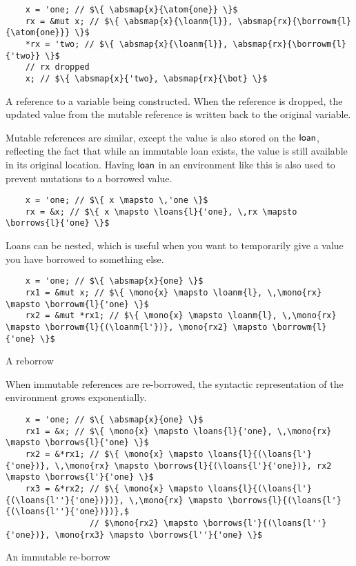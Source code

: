 \documentclass[12pt,twoside]{report}
\begin{document}
\begin{listing}[H]
  \begin{verbatim}
    x = 'one; // $\{ \absmap{x}{\atom{one}} \}$
    rx = &mut x; // $\{ \absmap{x}{\loanm{l}}, \absmap{rx}{\borrowm{l}{\atom{one}}} \}$
    *rx = 'two; // $\{ \absmap{x}{\loanm{l}}, \absmap{rx}{\borrowm{l}{'two}} \}$
    // rx dropped
    x; // $\{ \absmap{x}{'two}, \absmap{rx}{\bot} \}$
  \end{verbatim}
  \caption{A reference to a variable being constructed. When the reference is dropped, the updated value from the mutable reference is written back to the original variable.}
\end{listing}

Mutable references are similar, except the value is also stored on the $\mathsf{loan}$, reflecting the fact that while an immutable loan exists, the value is still available in its original location. Having $\mathsf{loan}$ in an environment like this is also used to prevent mutations to a borrowed value.

\begin{listing}[H]
  \begin{verbatim}
    x = 'one; // $\{ x \mapsto \,'one \}$
    rx = &x; // $\{ x \mapsto \loans{l}{'one}, \,rx \mapsto \borrows{l}{'one} \}$
  \end{verbatim}
\end{listing}

Loans can be nested, which is useful when you want to temporarily give a value you have borrowed to something else.

\begin{listing}[H]
  \begin{verbatim}
    x = 'one; // $\{ \absmap{x}{one} \}$
    rx1 = &mut x; // $\{ \mono{x} \mapsto \loanm{l}, \,\mono{rx} \mapsto \borrowm{l}{'one} \}$
    rx2 = &mut *rx1; // $\{ \mono{x} \mapsto \loanm{l}, \,\mono{rx} \mapsto \borrowm{l}{(\loanm{l'})}, \mono{rx2} \mapsto \borrowm{l}{'one} \}$
  \end{verbatim}
  \caption{A reborrow}
\end{listing}

When immutable references are re-borrowed, the syntactic representation of the environment grows exponentially.

\begin{listing}[H]
  \begin{verbatim}
    x = 'one; // $\{ \absmap{x}{one} \}$
    rx1 = &x; // $\{ \mono{x} \mapsto \loans{l}{'one}, \,\mono{rx} \mapsto \borrows{l}{'one} \}$
    rx2 = &*rx1; // $\{ \mono{x} \mapsto \loans{l}{(\loans{l'}{'one})}, \,\mono{rx} \mapsto \borrows{l}{(\loans{l'}{'one})}, rx2 \mapsto \borrows{l'}{'one} \}$
    rx3 = &*rx2; // $\{ \mono{x} \mapsto \loans{l}{(\loans{l'}{(\loans{l''}{'one})})}, \,\mono{rx} \mapsto \borrows{l}{(\loans{l'}{(\loans{l''}{'one})})},$
                 // $\mono{rx2} \mapsto \borrows{l'}{(\loans{l''}{'one})}, \mono{rx3} \mapsto \borrows{l''}{'one} \}$
  \end{verbatim}
  \caption{An immutable re-borrow}
\end{listing}
\end{document}
